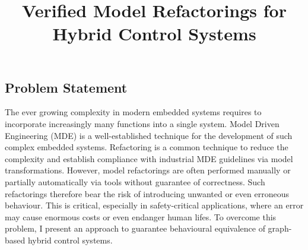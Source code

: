 \documentclass[conference]{IEEEtran}
\begin{document}
\title{\hspace*{-6mm}\begin{minipage}{1.1\linewidth}Verified Model Refactorings for Hybrid Control Systems\end{minipage}}
\author{
}
\maketitle

\subsection*{Problem Statement}

The ever growing complexity in modern embedded systems requires to incorporate increasingly many functions into a single system. %
Model Driven Engineering (MDE) is a well-established technique for the development of such complex embedded systems. 
Refactoring is a common technique to reduce the complexity and establish compliance with industrial MDE guidelines via model transformations. However, model refactorings are often performed manually or partially automatically via tools without guarantee of correctness. Such refactorings therefore bear the risk of introducing unwanted or even erroneous behaviour. This is critical, especially in safety-critical applications, where an error may cause enormous costs or even endanger human lifes. To overcome this problem, I present an approach to guarantee behavioural equivalence of graph-based hybrid control systems.

\end{document}
